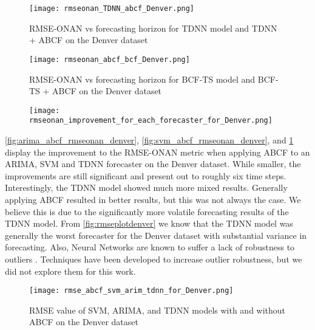 \begin{figure}[p]
	\begin{center}
		\texttt{[image: rmseonan\_TDNN\_abcf\_Denver.png]}
	\end{center}
	\caption{RMSE-ONAN vs forecasting horizon for TDNN model and TDNN + ABCF on the Denver dataset}
	\label{fig:tdnn_abcf_rmseonan_denver}
\end{figure}

\begin{figure}[p]
	\begin{center}
		\texttt{[image: rmseonan\_abcf\_bcf\_Denver.png]}
	\end{center}
	\caption{RMSE-ONAN vs forecasting horizon for BCF-TS model and BCF-TS + ABCF on the Denver dataset}
	\label{fig:bcf_abcf_rmseonan_denver}
\end{figure}

\begin{figure}[p]
	\begin{center}
		\texttt{[image: rmseonan\_improvement\_for\_each\_forecaster\_for\_Denver.png]}
	\end{center}
	\caption{}
	\label{fig:rmseonan_improve_denver}
\end{figure}

\ref{fig:arima_abcf_rmseonan_denver}, \ref{fig:svm_abcf_rmseonan_denver}, and \ref{fig:tdnn_abcf_rmseonan_denver} display the improvement to the RMSE-ONAN metric when applying ABCF to an ARIMA, SVM and TDNN forecaster on the Denver dataset.  While smaller, the improvements are still significant and present out to roughly six time steps.  Interestingly, the TDNN model showed much more mixed results.  Generally applying ABCF resulted in better results, but this was not always the case.  We believe this is due to the significantly more volatile forecasting results of the TDNN model.  From \ref{fig:rmseplotdenver} we know that the TDNN model was generally the worst forecaster for the Denver dataset with substantial variance in forecasting.  Also, Neural Networks are known to suffer a lack of robustness to outliers \cite{connor1994}.  Techniques have been developed to increase outlier robustness, but we did not explore them for this work.

\begin{figure}[p]
	\begin{center}
		\texttt{[image: rmse\_abcf\_svm\_arim\_tdnn\_for\_Denver.png]}
	\end{center}
	\caption{RMSE value of SVM, ARIMA, and TDNN models with and without ABCF on the Denver dataset}
	\label{fig:rmse_compare_denver_svm}
\end{figure}

